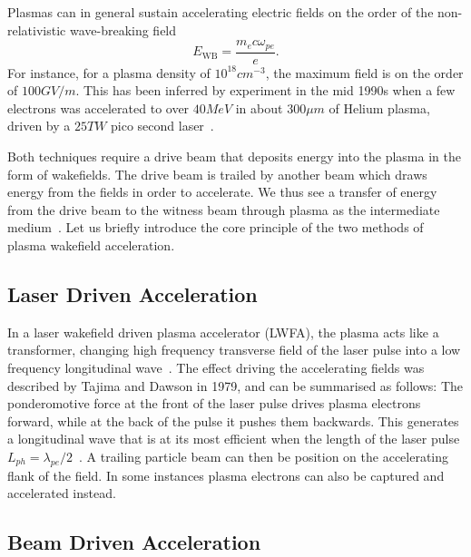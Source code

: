 Plasmas can in general sustain accelerating electric fields on the order of the non-relativistic wave-breaking field~\cite{dawson:1959, esarey:1996}
\begin{equation}
    E_{\mathrm{WB}} = \frac{m_{e} c \omega_{pe}}{e}. \label{EQ:EWB}
\end{equation}
For instance, for a plasma density of $10^{18}\unit{cm}^{-3}$, the maximum field is on the order of $100\unit{GV/m}$.
This has been inferred by experiment in the mid 1990s when a few electrons was accelerated to over $40\unit{MeV}$ in about $300\unit{\mu m}$ of Helium plasma, driven by a $25\unit{TW}$ pico second laser~\cite{modena:1995}.

Both techniques require a drive beam that deposits energy into the plasma in the form of wakefields.
The drive beam is trailed by another beam which draws energy from the fields in order to accelerate.
We thus see a transfer of energy from the drive beam to the witness beam through plasma as the intermediate medium~\cite{muggli:2009}.
Let us briefly introduce the core principle of the two methods of plasma wakefield acceleration. 

\subsection{Laser Driven Acceleration}
\label{Int:LWFA}

In a laser wakefield driven plasma accelerator (LWFA), the plasma acts like a transformer, changing high frequency transverse field of the laser pulse into a low frequency longitudinal wave~\cite{malka:2009}.
The effect driving the accelerating fields was described by Tajima and Dawson in 1979, and can be summarised as follows:
The ponderomotive force at the front of the laser pulse drives plasma electrons forward, while at the back of the pulse it pushes them backwards.
This generates a longitudinal wave that is at its most efficient when the length of the laser pulse $L_{ph} = \lambda_{pe}/2$~\cite{tajima:1979}.
A trailing particle beam can then be position on the accelerating flank of the field.
In some instances plasma electrons can also be captured and accelerated instead.

\subsection{Beam Driven Acceleration}
\label{Int:BDPWFA}

